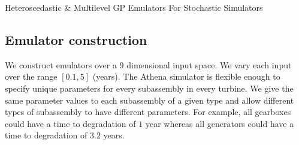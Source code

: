 \begin{chapter}{Heteroscedastic \& Multilevel GP Emulators For Stochastic Simulators\label{Ch:Hetsml}}

\subsection{Emulator construction}
\label{sec:em-con}

We construct emulators over a $9$ dimensional input space.  We vary each input over the range $[0.1, 5]$ (years). The Athena simulator is flexible enough to specify unique parameters for every subassembly in every turbine. We give the same parameter values to each subassembly of a given type and allow different types of subassembly to have different parameters. For example, all gearboxes could have a time to degradation of $1$ year whereas all generators could have a time to degradation of $3.2$ years.


\end{chapter}
